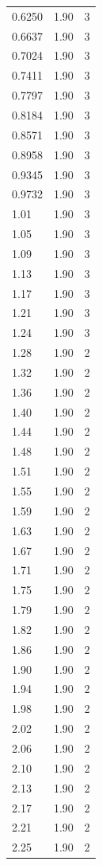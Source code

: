 \begin{longtable}{lrr}
  0.6250 & 1.90 & 3 \\
  0.6637 & 1.90 & 3 \\
  0.7024 & 1.90 & 3 \\
  0.7411 & 1.90 & 3 \\
  0.7797 & 1.90 & 3 \\
  0.8184 & 1.90 & 3 \\
  0.8571 & 1.90 & 3 \\
  0.8958 & 1.90 & 3 \\
  0.9345 & 1.90 & 3 \\
  0.9732 & 1.90 & 3 \\
  1.01 & 1.90 & 3 \\
  1.05 & 1.90 & 3 \\
  1.09 & 1.90 & 3 \\
  1.13 & 1.90 & 3 \\
  1.17 & 1.90 & 3 \\
  1.21 & 1.90 & 3 \\
  1.24 & 1.90 & 3 \\
  1.28 & 1.90 & 2 \\
  1.32 & 1.90 & 2 \\
  1.36 & 1.90 & 2 \\
  1.40 & 1.90 & 2 \\
  1.44 & 1.90 & 2 \\
  1.48 & 1.90 & 2 \\
  1.51 & 1.90 & 2 \\
  1.55 & 1.90 & 2 \\
  1.59 & 1.90 & 2 \\
  1.63 & 1.90 & 2 \\
  1.67 & 1.90 & 2 \\
  1.71 & 1.90 & 2 \\
  1.75 & 1.90 & 2 \\
  1.79 & 1.90 & 2 \\
  1.82 & 1.90 & 2 \\
  1.86 & 1.90 & 2 \\
  1.90 & 1.90 & 2 \\
  1.94 & 1.90 & 2 \\
  1.98 & 1.90 & 2 \\
  2.02 & 1.90 & 2 \\
  2.06 & 1.90 & 2 \\
  2.10 & 1.90 & 2 \\
  2.13 & 1.90 & 2 \\
  2.17 & 1.90 & 2 \\
  2.21 & 1.90 & 2 \\
  2.25 & 1.90 & 2 \\

\end{longtable}
